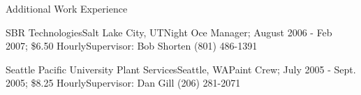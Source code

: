 \documentclass[11pt,oneside]{article}
\begin{document}
\heading

\begin{ressection}{Additional Work Experience}


    \begin{expsubsec}{SBR Technologies}{Salt Lake City, UT}{Night Oce Manager; August 2006 - Feb 2007; \$6.50 Hourly}{Supervisor: Bob Shorten (801) 486-1391}
    \end{expsubsec}

    \begin{expsubsec}{Seattle Pacific University Plant Services}{Seattle, WA}{Paint Crew; July 2005 - Sept. 2005; \$8.25 Hourly}{Supervisor: Dan Gill (206) 281-2071}
    \end{expsubsec}




\end{ressection}
\end{document}
